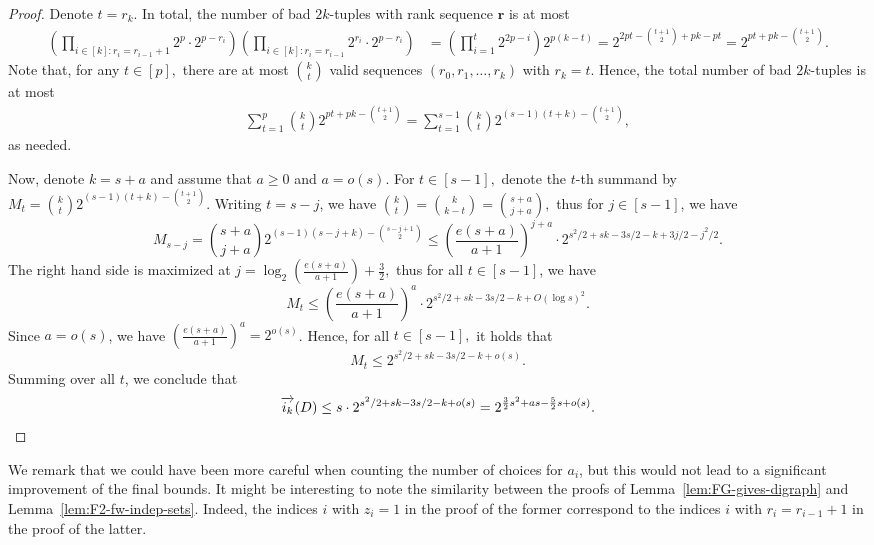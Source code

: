 \documentclass{article}
\theoremstyle{plain}
\theoremstyle{definition}
\newcommand{\br}{\mathbf{r}}
\newcommand{\fwi}[1]{\overrightarrow{i_{#1}}}
\begin{document}
\begin{proof}
    Denote $t = r_k$. In total, the number of bad $2k$-tuples with rank sequence $\br$ is at most
    \begin{align*}
        \left( \prod_{i \in [k] \colon r_i = r_{i-1} + 1} 2^p \cdot 2^{p - r_i}\right) \left( \prod_{i \in [k] \colon r_i = r_{i-1}} 2^{r_i} \cdot 2^{p - r_i} \right) &= \left(\prod_{i=1}^t 2^{2p - i}\right) 2^{p(k - t)} = 2^{2p t - \binom{t + 1}{2} + pk - pt} = 2^{pt + pk - \binom{t+1}{2}}.
    \end{align*}
    Note that, for any $t \in [p],$ there are at most $\binom{k}{t}$ valid sequences $(r_0, r_1, \dots, r_k)$ with $r_k = t$. Hence, the total number of bad $2k$-tuples is at most
    \begin{align*}
        \sum_{t=1}^p \binom{k}{t} 2^{pt + pk - \binom{t+1}{2}} = \sum_{t=1}^{s-1} \binom{k}{t} 2^{(s-1)(t+k) - \binom{t+1}{2}},
    \end{align*}
    as needed.

    Now, denote $k = s+a$ and assume that $a \ge 0$ and $a = o(s)$. For $t \in [s-1],$ denote the $t$-th summand by $M_t = \binom{k}{t} 2^{(s-1)(t+k) - \binom{t+1}{2}}$. Writing $t = s - j$, we have $\binom{k}{t} = \binom{k}{k-t} = \binom{s+a}{j+a},$ thus for $j \in [s-1]$, we have 
    \[ M_{s-j} = \binom{s+a}{j+a} 2^{(s-1)(s-j+k) - \binom{s-j+1}{2}} \le \left(\frac{e(s+a)}{a+1}\right)^{j+a} \cdot 2^{s^2/2 + sk - 3s/2 - k + 3j/2 - j^2/2}. \]
    The right hand side is maximized at $j = \log_2\left( 
    \frac{e(s+a)}{a+1} \right) + \frac{3}{2},$ thus for all $t \in [s-1]$, we have
    \[ M_t \le \left(\frac{e(s+a)}{a+1}\right)^a \cdot 2^{s^2/2 + sk - 3s/2 - k + O(\log s)^2}. \]
    Since $a = o(s)$, we have $\left(\frac{e(s+a)}{a+1}\right)^a = 2^{o(s)}$. Hence, for all $t \in [s-1],$ it holds that
    \[ M_t \le 2^{s^2/2 + sk - 3s/2 - k + o(s)}. \]
    Summing over all $t$, we conclude that 
    \begin{equation*}
        \fwi{k}(D) \le s \cdot 2^{s^2/2 + sk - 3s/2 - k + o(s)} = 2^{\frac{3}{2}s^2 + as - \frac{5}{2}s + o(s)}. \qedhere
    \end{equation*}
\end{proof}
We remark that we could have been more careful when counting the number of choices for $a_i$, but this would not lead to a significant improvement of the final bounds. It might be interesting to note the similarity between the proofs of Lemma~\ref{lem:FG-gives-digraph} and Lemma~\ref{lem:F2-fw-indep-sets}. Indeed, the indices $i$ with $z_i = 1$ in the proof of the former correspond to the indices $i$ with $r_i = r_{i-1} + 1$ in the proof of the latter.
\end{document}
